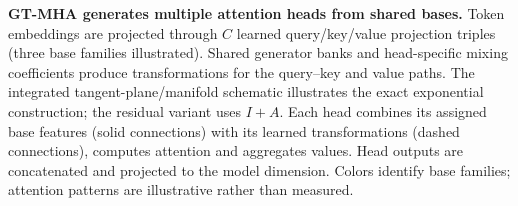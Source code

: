 \caption{\textbf{GT-MHA generates multiple attention heads from shared bases.}
Token embeddings are projected through $C$ learned query/key/value projection triples (three base families illustrated). Shared generator banks and head-specific mixing coefficients produce transformations for the query--key and value paths. The integrated tangent-plane/manifold schematic illustrates the exact exponential construction; the residual variant uses $I+A$. Each head combines its assigned base features (solid connections) with its learned transformations (dashed connections), computes attention and aggregates values. Head outputs are concatenated and projected to the model dimension. Colors identify base families; attention patterns are illustrative rather than measured.}
\label{fig:gt-mha-architecture}
